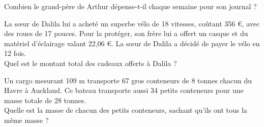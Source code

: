 \documentclass[11pt]{article}
\begin{document}
\begin{exercice}
{  Combien le grand-père de Arthur dépense-t-il chaque semaine pour son
  journal ?  
\item La sœur de Dalila lui a acheté un superbe vélo de 18 vitesses, coûtant 356 €, avec des roues de 17 pouces. Pour la protéger, son frère lui a offert un casque et du matériel d'éclairage valant 22,06 €. La sœur de Dalila a décidé de payer le vélo en 12 fois.\\
  Quel est le montant total des cadeaux offerts à Dalila ?
\item Un cargo mesurant 109 m transporte 67 gros conteneurs de 8 tonnes chacun du Havre à Auckland. Ce bateau transporte aussi 34 petits conteneurs pour une masse totale de 28 tonnes.\\
  Quelle est la masse de chacun des petits conteneurs, sachant qu'ils
  ont tous la même masse ?}
\end{exercice}

\newpage
\end{document}
